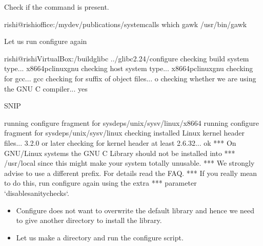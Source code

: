 \documentclass[letterpaper,10pt,english]{sphinxmanual}
\begin{document}
Check if the command is present.

\begin{sphinxVerbatim}[commandchars=\\\{\}]
rishi@rishi\PYGZhy{}office:\PYGZti{}/mydev/publications/system\PYGZus{}calls\PYGZdl{} which gawk
/usr/bin/gawk
\end{sphinxVerbatim}

Let us run configure again

\begin{sphinxVerbatim}[commandchars=\\\{\}]
rishi@rishi\PYGZhy{}VirtualBox:\PYGZti{}/build\PYGZus{}glibc\PYGZdl{} ../glibc\PYGZhy{}2.24/configure
checking build system type... x86\PYGZus{}64\PYGZhy{}pc\PYGZhy{}linux\PYGZhy{}gnu
checking host system type... x86\PYGZus{}64\PYGZhy{}pc\PYGZhy{}linux\PYGZhy{}gnu
checking for gcc... gcc
checking for suffix of object files... o
checking whether we are using the GNU C compiler... yes

\PYGZgt{}\PYGZgt{}\PYGZgt{}\PYGZgt{}\PYGZgt{}\PYGZgt{}\PYGZgt{}\PYGZgt{}\PYGZgt{}\PYGZgt{}SNIP\PYGZlt{}\PYGZlt{}\PYGZlt{}\PYGZlt{}\PYGZlt{}\PYGZlt{}\PYGZlt{}\PYGZlt{}\PYGZlt{}\PYGZlt{}\PYGZlt{}\PYGZlt{}\PYGZlt{}\PYGZlt{}\PYGZlt{}\PYGZlt{}\PYGZlt{}\PYGZlt{}\PYGZlt{}\PYGZlt{}\PYGZlt{}\PYGZlt{}

running configure fragment for sysdeps/unix/sysv/linux/x86\PYGZus{}64
running configure fragment for sysdeps/unix/sysv/linux
checking installed Linux kernel header files... 3.2.0 or later
checking for kernel header at least 2.6.32... ok
*** On GNU/Linux systems the GNU C Library should not be installed into
*** /usr/local since this might make your system totally unusable.
*** We strongly advise to use a different prefix.  For details read the FAQ.
*** If you really mean to do this, run configure again using the extra
*** parameter {}`\PYGZhy{}\PYGZhy{}disable\PYGZhy{}sanity\PYGZhy{}checks{}`.
\end{sphinxVerbatim}
\begin{itemize}
\item {} 
Configure does not want to overwrite the default library and hence we need to give another directory to install the library.

\item {} 
Let us make a directory and run the configure script.

\end{itemize}
\end{document}
